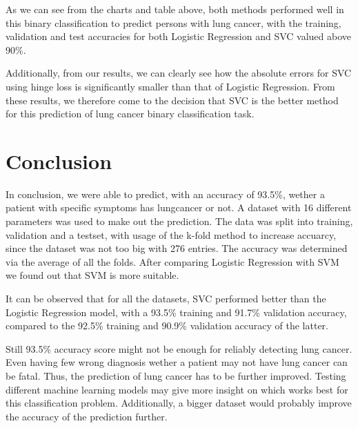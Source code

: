 \documentclass[a4paper,12pt]{article}
\begin{document}
As we can see from the charts and table above, both methods performed well in this binary classification to predict persons with lung cancer, with the training, validation and test accuracies for both Logistic Regression and SVC valued above 90\%.

Additionally, from our results, we can clearly see how the absolute errors for SVC using hinge loss is significantly smaller than that of Logistic Regression.
From these results, we therefore come to the decision that SVC is the better method for this prediction of lung cancer binary classification task.

\section{Conclusion}
\label{sec:org5ec8b8f}

In conclusion, we were able to predict, with an accuracy of 93.5\%, wether a patient with specific symptoms has lungcancer or not.
A dataset with 16 different parameters was used to make out the prediction.
The data was split into training, validation and a testset, with usage of the k-fold method to increase accuarcy, since the dataset was not too big with 276 entries.
The accuracy was determined via the average of all the folds.
After comparing Logistic Regression with SVM we found out that SVM is more suitable.

It can be observed that for all the datasets, SVC performed better than the Logistic Regression model, with a 93.5\% training and 91.7\% validation accuracy, compared to the 92.5\% training and 90.9\% validation accuracy of the latter.

Still 93.5\% accuracy score might not be enough for reliably detecting lung cancer.
Even having few wrong diagnosis wether a patient may not have lung cancer can be fatal. Thus, the prediction of lung cancer has to be further improved.
Testing different machine learning models may give more insight on which works best for this classification problem.
Additionally, a bigger dataset would probably improve the accuracy of the prediction further.
\end{document}
